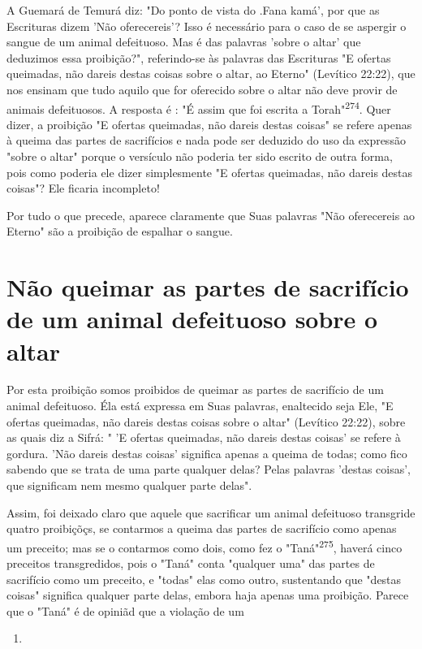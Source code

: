 \begin{itemize}
\begin{enumrate}
\begin{itemize}
\begin{itemize}
\begin{itemize}
A Guemará de Temurá diz: "Do ponto de vista do .Fana
kamá', por que as Escrituras dizem 'Não oferecereis'? Isso é necessário
para o caso de se aspergir o sangue de um animal defeituoso. Mas é das
palavras 'sobre o altar' que deduzimos essa proibição?", referindo-se às
palavras das Escrituras "E ofertas queimadas, não dareis destas coisas
sobre o altar, ao Eterno" (Levítico 22:22), que nos ensinam que tudo
aquilo que for oferecido sobre o altar não deve pro­vir de animais
defeituosos. A resposta é : "É assim que foi escrita a
Torah"\textsuperscript{274}. Quer dizer, a proibição "E ofertas
queimadas, não dareis destas coisas" se refe­re apenas à queima das
partes de sacrifícios e nada pode ser deduzido do uso da expressão
"sobre o altar" porque o versículo não poderia ter sido escrito de outra
forma, pois como poderia ele dizer simplesmente "E ofertas queima­das,
não dareis destas coisas"? Ele ficaria incompleto!

Por tudo o que precede, aparece claramente que Suas palavras "Não
oferecereis ao Eterno" são a proibição de espalhar o sangue.

\section{Não queimar as partes de sacrifício de um animal defeituoso sobre o altar}

Por esta proibição somos proibidos de queimar as partes de sacrifí­cio
de um animal defeituoso. Éla está expressa em Suas palavras, enaltecido
se­ja Ele, "E ofertas queimadas, não dareis destas coisas sobre o altar"
(Levítico 22:22), sobre as quais diz a Sifrá: " 'E ofertas queimadas,
não dareis destas coi­sas' se refere à gordura. 'Não dareis destas
coisas' significa apenas a queima de todas; como fico sabendo que se
trata de uma parte qualquer delas? Pelas pala­vras 'destas coisas', que
significam nem mesmo qualquer parte delas".

Assim, foi deixado claro que aquele que sacrificar um animal defei­tuoso
transgride quatro proibiçõçs, se contarmos a queima das partes de
sacri­fício como apenas um preceito; mas se o contarmos como dois, como
fez o "Taná"\textsuperscript{275}, haverá cinco preceitos transgredidos,
pois o "Taná" conta "qual­quer uma" das partes de sacrifício como um
preceito, e "todas" elas como ou­tro, sustentando que "destas coisas"
significa qualquer parte delas, embora ha­ja apenas uma proibição.
Parece que o "Taná" é de opiniãd que a violação de um


\begin{enumerate}
\def\labelenumi{\arabic{enumi}.}
\setcounter{enumi}{273}
\item
 

\end{enumerate}
\end{itemize}
\end{itemize}
\end{itemize}
\end{enumrate}
\end{itemize}
